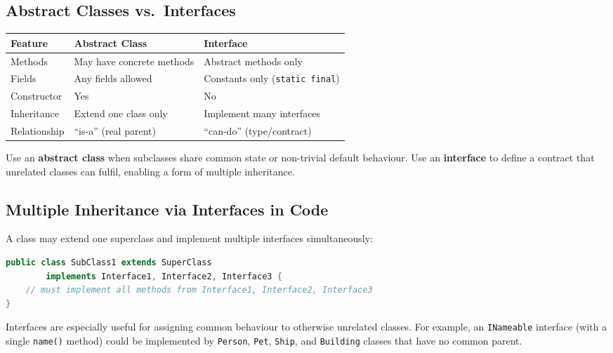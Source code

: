\documentclass[11pt, a4paper, notitlepage]{report}
\theoremstyle{definition}
\theoremstyle{remark}
\theoremstyle{definition}
\begin{document}
\subsection{Abstract Classes vs.\ Interfaces}
\label{sec:ch3-abstract-vs-interface}

\begin{center}
\begin{tabular}{lll}
\hline
\textbf{Feature} & \textbf{Abstract Class} & \textbf{Interface} \\
\hline
Methods & May have concrete methods & Abstract methods only \\
Fields & Any fields allowed & Constants only (\texttt{static final}) \\
Constructor & Yes & No \\
Inheritance & Extend one class only & Implement many interfaces \\
Relationship & ``is-a'' (real parent) & ``can-do'' (type/contract) \\
\hline
\end{tabular}
\end{center}

\begin{keyresult}[title={Key Result: Abstract vs. Interface}]
Use an \textbf{abstract class} when subclasses share common state or non-trivial default behaviour. Use an \textbf{interface} to define a contract that unrelated classes can fulfil, enabling a form of multiple inheritance.
\end{keyresult}

\subsection{Multiple Inheritance via Interfaces in Code}
\label{sec:ch3-multiple-via-interface}

A class may extend one superclass and implement multiple interfaces simultaneously:

\begin{lstlisting}[language=Java]
public class SubClass1 extends SuperClass
        implements Interface1, Interface2, Interface3 {
    // must implement all methods from Interface1, Interface2, Interface3
}
\end{lstlisting}

Interfaces are especially useful for assigning common behaviour to otherwise unrelated classes. For example, an \texttt{INameable} interface (with a single \texttt{name()} method) could be implemented by \texttt{Person}, \texttt{Pet}, \texttt{Ship}, and \texttt{Building}  classes that have no common parent.
\end{document}
